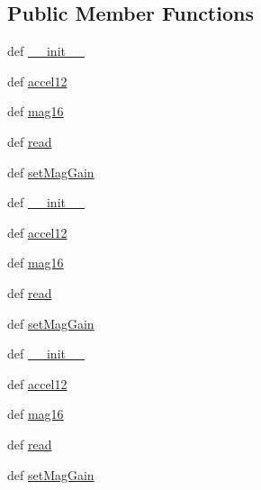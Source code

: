 \subsection*{Public Member Functions}
\begin{DoxyCompactItemize}
\item 
def \hyperlink{classdriver_1_1DRIVER__CORE_1_1Adafruit__LSM303_ae5cf180d90f8866edaab4807bbe8f7bc}{\+\_\+\+\_\+init\+\_\+\+\_\+}
\item 
def \hyperlink{classdriver_1_1DRIVER__CORE_1_1Adafruit__LSM303_a73f30f042346b5134d46ac40ea05287c}{accel12}
\item 
def \hyperlink{classdriver_1_1DRIVER__CORE_1_1Adafruit__LSM303_a14da193d80d260f4d95a2636067685ce}{mag16}
\item 
def \hyperlink{classdriver_1_1DRIVER__CORE_1_1Adafruit__LSM303_a120ac3815a90e0b4ff49ae60958d568c}{read}
\item 
def \hyperlink{classdriver_1_1DRIVER__CORE_1_1Adafruit__LSM303_a91452cc4c7ef0ab07e886843e1cc90dd}{set\+Mag\+Gain}
\item 
def \hyperlink{classdriver_1_1DRIVER__CORE_1_1Adafruit__LSM303_ae5cf180d90f8866edaab4807bbe8f7bc}{\+\_\+\+\_\+init\+\_\+\+\_\+}
\item 
def \hyperlink{classdriver_1_1DRIVER__CORE_1_1Adafruit__LSM303_a73f30f042346b5134d46ac40ea05287c}{accel12}
\item 
def \hyperlink{classdriver_1_1DRIVER__CORE_1_1Adafruit__LSM303_a14da193d80d260f4d95a2636067685ce}{mag16}
\item 
def \hyperlink{classdriver_1_1DRIVER__CORE_1_1Adafruit__LSM303_a120ac3815a90e0b4ff49ae60958d568c}{read}
\item 
def \hyperlink{classdriver_1_1DRIVER__CORE_1_1Adafruit__LSM303_a91452cc4c7ef0ab07e886843e1cc90dd}{set\+Mag\+Gain}
\item 
def \hyperlink{classdriver_1_1DRIVER__CORE_1_1Adafruit__LSM303_ae5cf180d90f8866edaab4807bbe8f7bc}{\+\_\+\+\_\+init\+\_\+\+\_\+}
\item 
def \hyperlink{classdriver_1_1DRIVER__CORE_1_1Adafruit__LSM303_a73f30f042346b5134d46ac40ea05287c}{accel12}
\item 
def \hyperlink{classdriver_1_1DRIVER__CORE_1_1Adafruit__LSM303_a14da193d80d260f4d95a2636067685ce}{mag16}
\item 
def \hyperlink{classdriver_1_1DRIVER__CORE_1_1Adafruit__LSM303_a120ac3815a90e0b4ff49ae60958d568c}{read}
\item 
def \hyperlink{classdriver_1_1DRIVER__CORE_1_1Adafruit__LSM303_a91452cc4c7ef0ab07e886843e1cc90dd}{set\+Mag\+Gain}

\end{DoxyCompactItemize}
